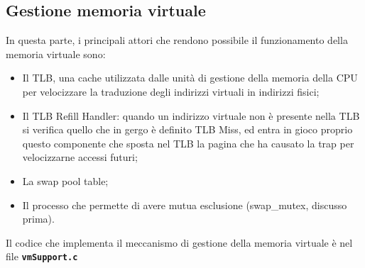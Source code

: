 \documentclass{article}
\begin{document}
	\newpage

	\subsection{Gestione memoria virtuale}
	In questa parte, i principali attori che rendono possibile il funzionamento
	della memoria virtuale sono:
	\begin{itemize}
		\item Il TLB, una cache utilizzata dalle unità di gestione della memoria
			della CPU per velocizzare la traduzione degli indirizzi virtuali in
			indirizzi fisici;

		\item Il TLB Refill Handler: quando un indirizzo virtuale non è presente
			nella TLB si verifica quello che in gergo è definito TLB Miss, ed entra in
			gioco proprio questo componente che sposta nel TLB la pagina che ha causato
			la trap per velocizzarne accessi futuri;

		\item La swap pool table;

		\item Il processo che permette di avere mutua esclusione (swap\_mutex, discusso
			prima).
	\end{itemize}

	Il codice che implementa il meccanismo di gestione della memoria virtuale è
	nel file \texttt{\textbf{vmSupport.c}}
\end{document}
